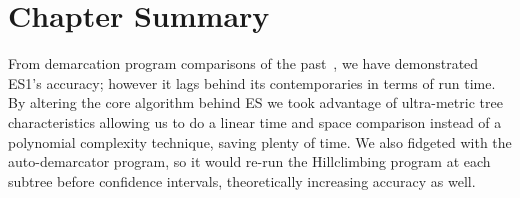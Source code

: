 %
%
%
%


\section{Chapter Summary}
From demarcation program comparisons of the past~\cite{carlo}, we have demonstrated ES1's accuracy; however it lags behind its contemporaries in terms of run time.
By altering the core algorithm behind ES we took advantage of ultra-metric tree characteristics allowing us to do a linear time and space comparison instead of a polynomial complexity technique, saving plenty of time.
We also fidgeted with the auto-demarcator program, so it would re-run the Hillclimbing program at each subtree before confidence intervals, theoretically increasing accuracy as well.

